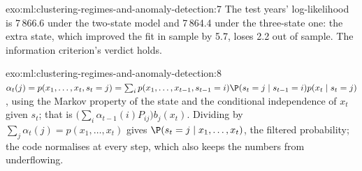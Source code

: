 \begin{solution}{exo:ml:clustering-regimes-and-anomaly-detection:7}
The test years' log-likelihood is 7\,866.6 under the two-state model and 7\,864.4 under the three-state one: the extra state,
which improved the fit in sample by 5.7, loses 2.2 out of sample. The information criterion's verdict holds.
\end{solution}

\begin{solution}{exo:ml:clustering-regimes-and-anomaly-detection:8}
$\alpha_t(j) = p(x_1,\dots,x_t, s_t = j) = \sum_ip(x_1,\dots,x_{t-1}, s_{t-1} = i)\P(s_t = j\mid s_{t-1} = i)p(x_t\mid s_t = j)$,
using the Markov property of the state and the conditional independence of $x_t$ given $s_t$; that is
$\big(\sum_i\alpha_{t-1}(i)P_{ij}\big)b_j(x_t)$. Dividing by $\sum_j\alpha_t(j) = p(x_1,\dots,x_t)$ gives $\P(s_t = j\mid
x_1,\dots,x_t)$, the filtered probability; the code normalises at every step, which also keeps the numbers from underflowing.
\end{solution}

